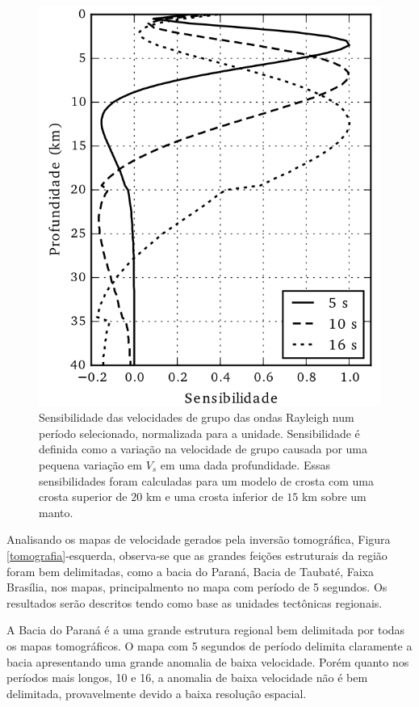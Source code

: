 \begin{figure}[!ht]
\centering
\includegraphics[scale=1]{Figs/sensibilidade.png}
\caption{Sensibilidade das velocidades de grupo das ondas Rayleigh num período selecionado, normalizada para a unidade. Sensibilidade é definida como a variação na velocidade de grupo causada por uma pequena variação em $V_{s}$ em uma dada profundidade. Essas sensibilidades foram calculadas para um modelo de crosta com uma crosta superior de $20$ km e uma crosta inferior de $15$ km sobre um manto.}
\label{sensibilidade}
\end{figure}

Analisando os mapas de velocidade gerados pela inversão tomográfica, Figura \ref{tomografia}-esquerda, observa-se que as grandes feições estruturais da região foram bem delimitadas, como a bacia do Paraná, Bacia de Taubaté, Faixa Brasília, nos mapas, principalmento no mapa com período de 5 segundos. Os resultados serão descritos tendo como base as unidades tectônicas regionais.

A Bacia do Paraná é a uma grande estrutura regional bem delimitada por todas os mapas tomográficos. O mapa com 5 segundos de período delimita claramente a bacia apresentando uma grande anomalia de baixa velocidade. Porém quanto nos períodos mais longos, 10 e 16, a anomalia de baixa velocidade não é bem delimitada, provavelmente devido a baixa resolução espacial. 

